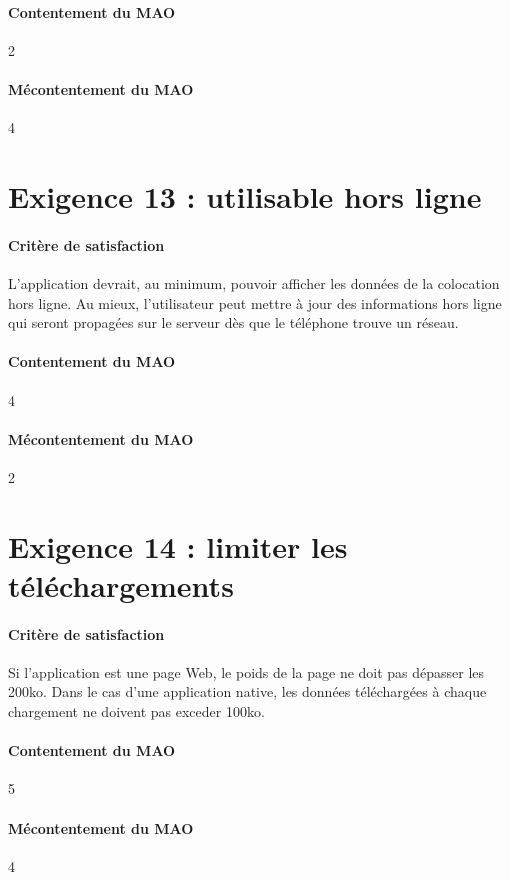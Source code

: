 \documentclass[a4paper, 12pt, french]{article}
\begin{document}
	\paragraph{Contentement du MAO}
	2

	\paragraph{Mécontentement du MAO}
	4

	\section{Exigence 13 : utilisable hors ligne}

	\paragraph{Critère de satisfaction}
	L'application devrait, au minimum, pouvoir afficher les données de la colocation hors ligne. Au mieux, l'utilisateur peut mettre à jour des informations hors ligne qui seront propagées sur le serveur dès que le téléphone trouve un réseau.

	\paragraph{Contentement du MAO}
	4

	\paragraph{Mécontentement du MAO}
	2

	\section{Exigence 14 : limiter les téléchargements}

	\paragraph{Critère de satisfaction}
	Si l'application est une page Web, le poids de la page ne doit pas dépasser les 200ko. Dans le cas d'une application native, les données téléchargées à chaque chargement ne doivent pas exceder 100ko.

	\paragraph{Contentement du MAO}
	5

	\paragraph{Mécontentement du MAO}
	4
\end{document}
